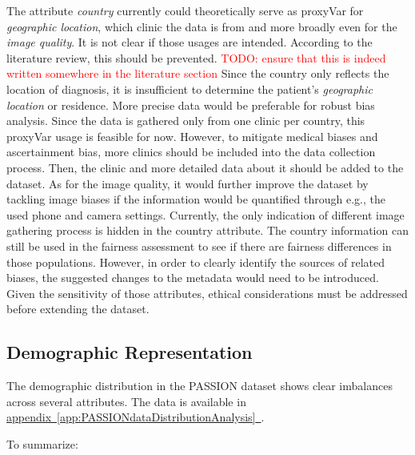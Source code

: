\documentclass[12pt, a4paper, oneside]{book}   	%
\renewcommand{\todo}[1]{\textcolor{red}{TODO: #1}}
\newcommand{\linkapp}[1]{\hyperref[#1]{appendix~\ref{#1}~\nameref{#1}}}
\begin{document}
		The attribute \textit{country} currently could theoretically serve as \gls{proxyVar} for \textit{geographic location}, which clinic the data is from and more broadly even for the \textit{image quality}. It is not clear if those usages are intended. According to the literature review, this should be prevented. \todo{ensure that this is indeed written somewhere in the literature section}
		Since the country only reflects the location of diagnosis, it is insufficient to determine the patient's \textit{geographic location} or residence. More precise data would be preferable for robust bias analysis.
		Since the data is gathered only from one clinic per country, this \gls{proxyVar} usage is feasible for now. However, to mitigate medical biases and ascertainment bias, more clinics should be included into the data collection process. Then, the clinic and more detailed data about it should be added to the dataset.
		As for the image quality, it would further improve the dataset by tackling image biases if the information would be quantified through e.g., the used phone and camera settings. Currently, the only indication of different image gathering process is hidden in the country attribute.
		The country information can still be used in the fairness assessment to see if there are fairness differences in those populations. However, in order to clearly identify the sources of related biases, the suggested changes to the metadata would need to be introduced. Given the sensitivity of those attributes, ethical considerations must be addressed before extending the dataset.
		
		\subsection{Demographic Representation}	\label{chap:PASSIONDatasetAssessmentEvalDemogRepr}
		The demographic distribution in the PASSION dataset shows clear imbalances across several attributes. The data is available in \linkapp{app:PASSIONdataDistributionAnalysis}.
		
		To summarize:
		
\end{document}
